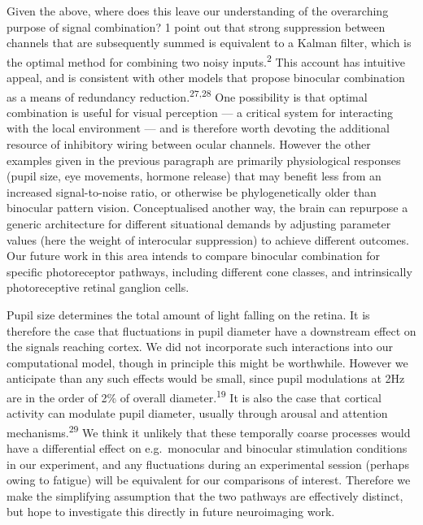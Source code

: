 \documentclass[
]{article}
\begin{document}
Given the above, where does this leave our understanding of the overarching purpose of signal combination? 1 point out that strong suppression between channels that are subsequently summed is equivalent to a Kalman filter, which is the optimal method for combining two noisy inputs.\textsuperscript{2} This account has intuitive appeal, and is consistent with other models that propose binocular combination as a means of redundancy reduction.\textsuperscript{27,28} One possibility is that optimal combination is useful for visual perception --- a critical system for interacting with the local environment --- and is therefore worth devoting the additional resource of inhibitory wiring between ocular channels. However the other examples given in the previous paragraph are primarily physiological responses (pupil size, eye movements, hormone release) that may benefit less from an increased signal-to-noise ratio, or otherwise be phylogenetically older than binocular pattern vision. Conceptualised another way, the brain can repurpose a generic architecture for different situational demands by adjusting parameter values (here the weight of interocular suppression) to achieve different outcomes. Our future work in this area intends to compare binocular combination for specific photoreceptor pathways, including different cone classes, and intrinsically photoreceptive retinal ganglion cells.

Pupil size determines the total amount of light falling on the retina. It is therefore the case that fluctuations in pupil diameter have a downstream effect on the signals reaching cortex. We did not incorporate such interactions into our computational model, though in principle this might be worthwhile. However we anticipate than any such effects would be small, since pupil modulations at 2Hz are in the order of 2\% of overall diameter.\textsuperscript{19} It is also the case that cortical activity can modulate pupil diameter, usually through arousal and attention mechanisms.\textsuperscript{29} We think it unlikely that these temporally coarse processes would have a differential effect on e.g.~monocular and binocular stimulation conditions in our experiment, and any fluctuations during an experimental session (perhaps owing to fatigue) will be equivalent for our comparisons of interest. Therefore we make the simplifying assumption that the two pathways are effectively distinct, but hope to investigate this directly in future neuroimaging work.
\end{document}
